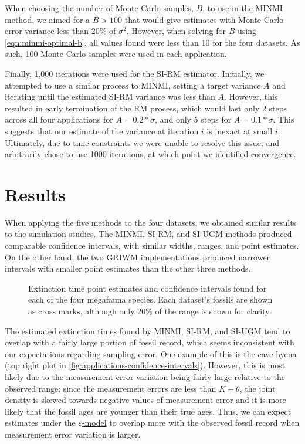 When choosing the number of Monte Carlo samples, $B$, to use in the MINMI method, we aimed for a $B > 100$ that would give estimates with Monte Carlo error variance less than 20\% of $\sigma^2$. However, when solving for $B$ using \autoref{eqn:minmi-optimal-b}, all values found were less than 10 for the four datasets. As such, 100 Monte Carlo samples were used in each application.

Finally, 1{\small,}000 iterations were used for the SI-RM estimator. Initially, we attempted to use a similar process to MINMI, setting a target variance $A$ and iterating until the estimated SI-RM variance was less than $A$. However, this resulted in early termination of the RM process, which would last only 2 steps across all four applications for $A  = 0.2*\sigma$, and only 5 steps for $A = 0.1*\sigma$. This suggests that our estimate of the variance at iteration $i$ is inexact at small $i$. Ultimately, due to time constraints we were unable to resolve this issue, and arbitrarily chose to use 1000 iterations, at which point we identified convergence.

\section{Results}

When applying the five methods to the four datasets, we obtained similar results to the simulation studies. The MINMI, SI-RM, and SI-UGM methods produced comparable confidence intervals, with similar widths, ranges, and point estimates. On the other hand, the two GRIWM implementations produced narrower intervals with smaller point estimates than the other three methods.
\begin{figure}[ht]
    \centering
    
    \caption{Extinction time point estimates and confidence intervals found for each of the four megafauna species. Each dataset's fossils are shown as cross marks, although only 20\% of the range is shown for clarity.}
    \label{fig:applications-confidence-intervals}
\end{figure}

The estimated extinction times found by MINMI, SI-RM, and SI-UGM tend to overlap with a fairly large portion of fossil record, which seems inconsistent with our expectations regarding sampling error. One example of this is the cave hyena (top right plot in \autoref{fig:applications-confidence-intervals}). However, this is most likely due to the measurement error variation being fairly large relative to the observed range: since the measurement errors are less than $K-\theta$, the joint density is skewed towards negative values of measurement error and it is more likely that the fossil ages are younger than their true ages. Thus, we can expect estimates under the \hyperref[model: measurement-error]{$\varepsilon$-model} to overlap more with the observed fossil record when measurement error variation is larger.

